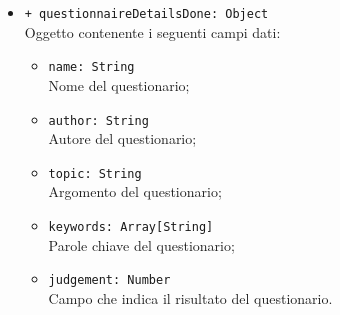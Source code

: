 \begin{itemize}
\begin{itemize}
			\item \texttt{+ questionnaireDetailsDone: Object} \\ Oggetto contenente i seguenti campi dati:
			\begin{itemize}
				\item \texttt{name: String}\\ Nome del questionario;
				\item \texttt{author: String}\\ Autore del questionario;
				\item \texttt{topic: String}\\ Argomento del questionario;
				\item \texttt{keywords: Array[String]}\\ Parole chiave del questionario;
				\item \texttt{judgement: Number} \\ Campo che indica il risultato del questionario.
			\end{itemize}
		\end{itemize}
	\end{itemize}
	
		